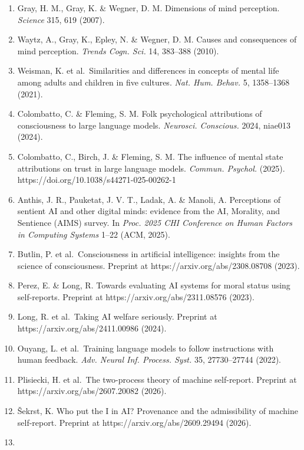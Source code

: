 \documentclass[
  11pt,
]{article}
\providecommand{\tightlist}{%
  \setlength{\itemsep}{0pt}\setlength{\parskip}{0pt}}
\begin{document}
\begin{enumerate}
\def\labelenumi{\arabic{enumi}.}
\tightlist
\item
  Gray, H. M., Gray, K. \& Wegner, D. M. Dimensions of mind perception.
  \emph{Science} 315, 619 (2007).
\item
  Waytz, A., Gray, K., Epley, N. \& Wegner, D. M. Causes and
  consequences of mind perception. \emph{Trends Cogn. Sci.} 14, 383--388
  (2010).
\item
  Weisman, K. et al.~Similarities and differences in concepts of mental
  life among adults and children in five cultures. \emph{Nat. Hum.
  Behav.} 5, 1358--1368 (2021).
\item
  Colombatto, C. \& Fleming, S. M. Folk psychological attributions of
  consciousness to large language models. \emph{Neurosci. Conscious.}
  2024, niae013 (2024).
\item
  Colombatto, C., Birch, J. \& Fleming, S. M. The influence of mental
  state attributions on trust in large language models. \emph{Commun.
  Psychol.} (2025). https://doi.org/10.1038/s44271-025-00262-1
\item
  Anthis, J. R., Pauketat, J. V. T., Ladak, A. \& Manoli, A. Perceptions
  of sentient AI and other digital minds: evidence from the AI,
  Morality, and Sentience (AIMS) survey. In \emph{Proc. 2025 CHI
  Conference on Human Factors in Computing Systems} 1--22 (ACM, 2025).
\item
  Butlin, P. et al.~Consciousness in artificial intelligence: insights
  from the science of consciousness. Preprint at
  https://arxiv.org/abs/2308.08708 (2023).
\item
  Perez, E. \& Long, R. Towards evaluating AI systems for moral status
  using self-reports. Preprint at https://arxiv.org/abs/2311.08576
  (2023).
\item
  Long, R. et al.~Taking AI welfare seriously. Preprint at
  https://arxiv.org/abs/2411.00986 (2024).
\item
  Ouyang, L. et al.~Training language models to follow instructions with
  human feedback. \emph{Adv. Neural Inf. Process. Syst.} 35,
  27730--27744 (2022).
\item
  Plisiecki, H. et al.~The two-process theory of machine self-report.
  Preprint at https://arxiv.org/abs/2607.20082 (2026).
\item
  Šekrst, K. Who put the I in AI? Provenance and the admissibility of
  machine self-report. Preprint at https://arxiv.org/abs/2609.29494
  (2026).
\item

\end{enumerate}
\end{document}
